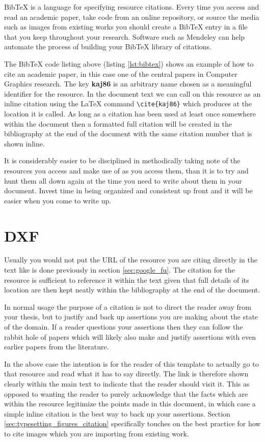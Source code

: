 		BibTeX is a language for specifying resource citations. Every time you access and read an academic paper, take code from an online repository, or source the media such as images from existing works you should create a BibTeX entry in a file that you keep throughout your research. Software such as Mendeley \cite{mendeley} can help automate the process of building your BibTeX library of citations. 
		
		
		
		The BibTeX code listing above (listing \ref{lst:bibtex}) shows an example of how to cite an academic paper, in this case one of the central papers in Computer Graphics research. The key \textbf{kaj86} is an arbitrary name chosen as a meaningful identifier for the resource. In the document text we can call on this resource as an inline citation using the LaTeX command \lstinline|\cite{kaj86}| which produces \cite{kaj86} at the location it is called. As long as a citation has been used at least once somewhere within the document then a formatted full citation will be created in the bibliography at the end of the document with the same citation number that is shown inline.
		
		It is considerably easier to be disciplined in methodically taking note of the resources you access and make use of as you access them, than it is to try and hunt them all down again at the time you need to write about them in your document. Invest time in being organized and consistent up front and it will be easier when you come to write up.
		
	\section{DXF}
		Usually you would not put the URL of the resource you are citing directly in the text like is done previously in section \ref{sec:google_fu}. The citation for the resource \cite{gwern} is sufficient to reference it within the text given that full details of its location are then kept neatly within the bibliography at the end of the document. 
		
		In normal usage the purpose of a citation is not to direct the reader away from your thesis, but to justify and back up assertions you are making about the state of the domain. If a reader questions your assertions then they can follow the rabbit hole of papers which will likely also make and justify assertions with even earlier papers from the literature. 
		
		In the above case the intention is for the reader of this template to actually go to that resource and read what it has to say directly. The link is therefore shown clearly within the main text to indicate that the reader should visit it. This as opposed to wanting the reader to purely acknowledge that the facts which are within the resource legitimize the points made in this document, in which case a simple inline citation is the best way to back up your assertions. Section \ref{sec:typesetting_figures_citation} specifically touches on the best practice for how to cite images which you are importing from existing work. 